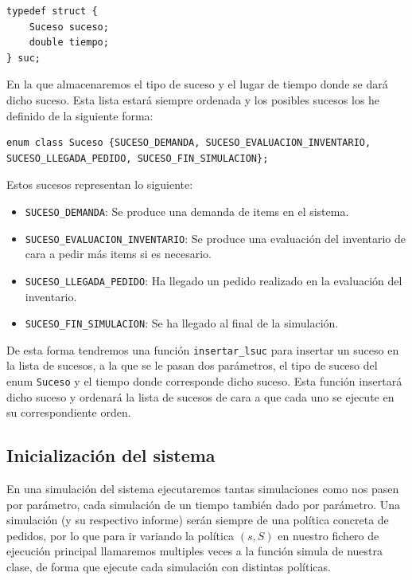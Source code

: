 \documentclass[12pt, spanish]{article}
\begin{document}
\begin{lstlisting}
typedef struct {
	Suceso suceso;
	double tiempo;
} suc;
\end{lstlisting}

En la que almacenaremos el tipo de suceso y el lugar de tiempo donde se dará dicho suceso. Esta lista estará siempre ordenada y los posibles sucesos los he definido de la siguiente forma:

\begin{lstlisting}
enum class Suceso {SUCESO_DEMANDA, SUCESO_EVALUACION_INVENTARIO, SUCESO_LLEGADA_PEDIDO, SUCESO_FIN_SIMULACION};
\end{lstlisting}

Estos sucesos representan lo siguiente:

\begin{itemize}
	\item \texttt{SUCESO\_DEMANDA}: Se produce una demanda de items en el sistema.
	\item \texttt{SUCESO\_EVALUACION\_INVENTARIO}: Se produce una evaluación del inventario de cara a pedir más items si es necesario.
	\item \texttt{SUCESO\_LLEGADA\_PEDIDO}: Ha llegado un pedido realizado en la evaluación del inventario.
	\item \texttt{SUCESO\_FIN\_SIMULACION}: Se ha llegado al final de la simulación.
\end{itemize}

De esta forma tendremos una función \texttt{insertar\_lsuc} para insertar un suceso en la lista de sucesos, a la que se le pasan dos parámetros, el tipo de suceso del enum \texttt{Suceso} y el tiempo donde corresponde dicho suceso. Esta función insertará dicho suceso y ordenará la lista de sucesos de cara a que cada uno se ejecute en su correspondiente orden.

\subsection{Inicialización del sistema}

En una simulación del sistema ejecutaremos tantas simulaciones como nos pasen por parámetro, cada simulación de un tiempo también dado por parámetro. Una simulación (y su respectivo informe) serán siempre de una política concreta de pedidos, por lo que para ir variando la política $(s, S)$ en nuestro fichero de ejecución principal llamaremos multiples veces a la función simula de nuestra clase, de forma que ejecute cada simulación con distintas políticas.
\end{document}
